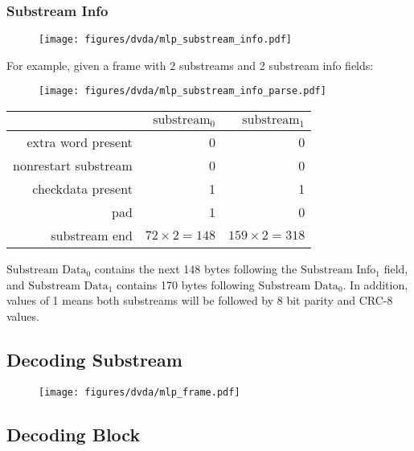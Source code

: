 \subsubsection{Substream Info}
\label{mlp:read_substream_info}
{
  
}
\begin{figure}[h]
  \texttt{[image: figures/dvda/mlp\_substream\_info.pdf]}
\end{figure}
\par
\noindent
For example, given a frame with 2 substreams
and 2 substream info fields:
\begin{figure}[h]
  \texttt{[image: figures/dvda/mlp\_substream\_info\_parse.pdf]}
\end{figure}
\begin{table}[h]
\begin{tabular}{rrr}
& $\text{substream}_0$ & $\text{substream}_1$ \\
\hline
extra word present & 0 & 0 \\
nonrestart substream & 0 & 0 \\
checkdata present & 1 & 1 \\
pad & 1 & 0 \\
substream end & $72 \times 2 = 148$ & $159 \times 2 = 318$ \\
\end{tabular}
\end{table}
\par
\noindent
$\text{Substream Data}_0$ contains
the next 148 bytes following the $\text{Substream Info}_1$ field,
and $\text{Substream Data}_1$ contains 170 bytes
following $\text{Substream Data}_0$.
In addition,  values of 1
means both substreams will be followed by 8 bit parity and CRC-8 values.

\clearpage

\subsection{Decoding Substream}
\label{mlp:decode_substream}
{
  
}

\begin{figure}[h]
  \texttt{[image: figures/dvda/mlp\_frame.pdf]}
\end{figure}


\clearpage

\subsection{Decoding Block}
\label{mlp:decode_block}
{
  
}


